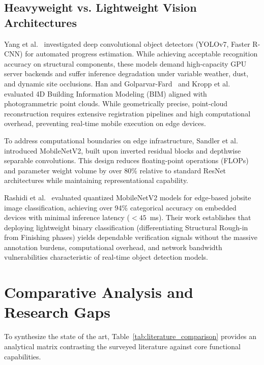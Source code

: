 \documentclass[conference]{IEEEtran}
\begin{document}
\subsection{Heavyweight vs. Lightweight Vision Architectures}
Yang et al.~\cite{yang2023computer} investigated deep convolutional object detectors (YOLOv7, Faster R-CNN) for automated progress estimation. While achieving acceptable recognition accuracy on structural components, these models demand high-capacity GPU server backends and suffer inference degradation under variable weather, dust, and dynamic site occlusions. Han and Golparvar-Fard~\cite{han2017potential} and Kropp et al.~\cite{kropp2018indoor} evaluated 4D Building Information Modeling (BIM) aligned with photogrammetric point clouds. While geometrically precise, point-cloud reconstruction requires extensive registration pipelines and high computational overhead, preventing real-time mobile execution on edge devices.

To address computational boundaries on edge infrastructure, Sandler et al.~\cite{sandler2018mobilenetv2} introduced MobileNetV2, built upon inverted residual blocks and depthwise separable convolutions. This design reduces floating-point operations (FLOPs) and parameter weight volume by over 80\% relative to standard ResNet architectures while maintaining representational capability.

Rashidi et al.~\cite{rashidi2024mobilenetv2} evaluated quantized MobileNetV2 models for edge-based jobsite image classification, achieving over 94\% categorical accuracy on embedded devices with minimal inference latency ($<45$~ms). Their work establishes that deploying lightweight binary classification (differentiating Structural Rough-in from Finishing phases) yields dependable verification signals without the massive annotation burdens, computational overhead, and network bandwidth vulnerabilities characteristic of real-time object detection models.

\section{Comparative Analysis and Research Gaps}

To synthesize the state of the art, Table~\ref{tab:literature_comparison} provides an analytical matrix contrasting the surveyed literature against core functional capabilities.
\end{document}
